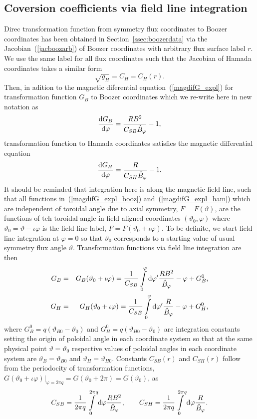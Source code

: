 \documentclass[12pt]{article}
\newcommand{\be}[1]{\begin{equation} \label{#1}}
\newcommand{\ee}{\end{equation}}
\newcommand{\bea}[1]{\begin{eqnarray} \label{#1}}
\newcommand{\eea}{\end{eqnarray}}
\newcommand{\eq}[1]{(\ref{#1})}
\newcommand{\rd}{{\rm d}}
\begin{document}
\subsection{Coversion coefficients via field line integration}
\label{ssec:conv_via_flint}
Direc transformation function from symmetry flux coordinates to Boozer coordinates
has been obtained in Section~\ref{ssec:boozerdata} via the Jacobian~\eq{jacboozarb} of Boozer coordinates
with arbitrary flux surface label $r$. We use the same label for all flux coordinates such that the Jacobian of
Hamada coordinates takes a similar form
\be{jachamarb}
\sqrt{g_H}=C_H=C_H(r).
\ee
Then, in adition to the magnetic diferential equation~\eq{magdifG_expl} for transformation function $G_B$ to Boozer coordinates
which we re-write here in new notation as
\be{magdifG_expl_booz}
\frac{\rd G_B}{\rd \varphi} =\frac{R B^2}{C_{SB} \hat B_\varphi}-1,
\ee
transformation function to Hamada coordinates satisfies the magnetic differential equation
\be{magdifG_expl_ham}
\frac{\rd G_H}{\rd \varphi} =\frac{R}{C_{SH} \hat B_\varphi}-1.
\ee
It should be reminded that integration here is along the magnetic field line, such that all functions in~\eq{magdifG_expl_booz}
and~\eq{magdifG_expl_ham} which are independent of toroidal angle due to axial symmetry, $F=F(\vartheta)$, are the functions of
teh toroidal angle in field aligned coordinates $(\vartheta_0,\varphi)$ where 
$\vartheta_0=\vartheta-\iota\varphi$ is the field line label, $F=F(\vartheta_0 + \iota \varphi)$. To be definite, we start
field line integration at $\varphi=0$ so that $\vartheta_0$ corresponds to a starting value of usual symmetry flux angle 
$\vartheta$. Transformation functions via field line integration are then
\bea{transf_mfl}
G_B &=& G_B(\vartheta_0+\iota\varphi)=\frac{1}{C_{SB}}\int\limits_0^\varphi\rd\varphi^\prime \frac{R B^2}{\hat B_\varphi}-\varphi
+G_B^0,
\nonumber \\
G_H &=& G_H(\vartheta_0+\iota\varphi)=\frac{1}{C_{SB}}\int\limits_0^\varphi\rd\varphi^\prime \frac{R}{\hat B_\varphi}-\varphi
+G_H^0,
\eea
where $G_B^0=q(\vartheta_{B0}-\vartheta_0)$ and 
$G_H^0=q(\vartheta_{H0}-\vartheta_0)$ are integration constants setting the origin of poloidal angle in each coordinate system
so that at the same physical point $\vartheta=\vartheta_0$ respective values of poloidal angles in each coordinate system are
$\vartheta_B=\vartheta_{B0}$ and $\vartheta_H=\vartheta_{H0}$.
Constants $C_{SB}(r)$ and $C_{SH}(r)$ follow from the periodocity of transformation functions,
$G(\vartheta_0 + \iota \varphi)|_{\varphi=2\pi q}=G(\vartheta_0 + 2\pi)=G(\vartheta_0)$, as
\be{C_SBH}
C_{SB}=\frac{1}{2\pi q}\int\limits_0^{2\pi q}\rd\varphi \frac{R B^2}{\hat B_\varphi},
\qquad
C_{SH}=\frac{1}{2\pi q}\int\limits_0^{2\pi q}\rd\varphi \frac{R}{\hat B_\varphi}.
\ee
\end{document}

